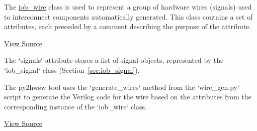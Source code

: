 %

%
%

The \href{https://github.com/IObundle/py2hwsw/blob/main/py2hwsw/scripts/iob_wire.py}{iob\_wire} class is used to represent a group of hardware wires (signals) used to interconnect components automatically generated.
This class contains a set of attributes, each preceded by a comment describing the purpose of the attribute.


\href{https://github.com/IObundle/py2hwsw/blob/main/py2hwsw/scripts/iob_wire.py}{View Source}

The `signals` attribute stores a list of signal objects, represented by the `iob\_signal` class (Section~\ref{sec:iob_signal}).

%
%

The py2hwsw tool uses the `generate\_wires` method from the `wire\_gen.py` script to generate the Verilog code for the wire based on the attributes from the corresponding instance of the `iob\_wire` class.


\href{https://github.com/IObundle/py2hwsw/blob/main/py2hwsw/scripts/wire_gen.py}{View Source}
